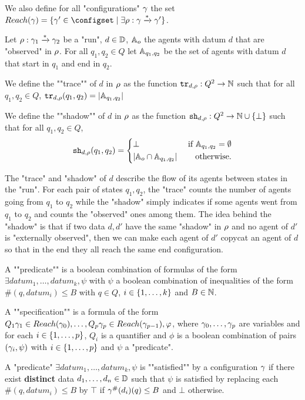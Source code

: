 We also define for all "configurations" $\gamma$ the set $\Reach(\config) = \set{\config' \in \configset \mid \exists \run : \config \xrightarrow{*} \config'}$.


\begin{definition}
	Let $\rho : \gamma_1 \xrightarrow{*} \gamma_2$ be a "run", $d\in \mathbb{D}$, $\mathbb{A}_o$ the agents with datum $d$ that are "observed" in $\rho$. For all $q_1, q_2 \in Q$ let $\mathbb{A}_{q_1, q_2}$ be the set of agents with datum $d$ that start in $q_1$ and end in $q_2$.
	
	We define the ""trace"" of $d$ in $\rho$ as the function $\mathtt{tr}_{d,\rho} : Q^2 \to \mathbb{N}$ such that for all $q_1, q_2 \in Q$,	$\mathtt{tr}_{d,\rho}(q_1, q_2) = |\mathbb{A}_{q_1, q_2}|$
		
	
	\AP We define the ""shadow"" of $d$ in $\rho$ as the function $\mathtt{sh}_{d,\rho} : Q^2 \to \mathbb{N} \cup \{\bot\}$ such that for all $q_1, q_2 \in Q$, 
	\begin{equation}
		\mathtt{sh}_{d,\rho}(q_1, q_2) = 
		\left\{
		\begin{aligned}
			&\bot &\text{ if } \mathbb{A}_{q_1,q_2} =\emptyset\\
			&|\mathbb{A}_o \cap \mathbb{A}_{q_1, q_2}| &\text{ otherwise.}
		\end{aligned}
		\right.
	\end{equation}
\end{definition}
%	
The "trace" and "shadow" of $d$ describe the flow of its agents between states in the "run". For each pair of states $q_1, q_2$, the "trace" counts the number of agents going from $q_1$ to $q_2$ while
the "shadow" simply indicates if some agents went from $q_1$ to $q_2$ and counts the "observed" ones among them. The idea behind the "shadow" is that if two data $d, d'$ have the same "shadow" in $\rho$ and no agent of $d'$ is "externally observed", then we can make each agent of $d'$ copycat an agent of $d$ so that in the end they all reach the same end configuration.


\begin{definition}
	A ""predicate"" is a boolean combination of formulas of the form $\exists datum_1, \ldots, datum_k, \psi$ with $\psi$ a boolean combination of inequalities of the form $\#(q,datum_i) \leq B$ with $q\in Q$, $i \in \{1,\dots,k\}$ and $B \in \mathbb{N}$.
	
	A ""specification"" is a formula of the form $Q_1 \gamma_1  \in Reach(\gamma_0), \ldots, Q_p \gamma_p \in Reach(\gamma_{p-1}), \varphi$, where $\gamma_0, \ldots, \gamma_{p}$ are variables and for each $i \in \{1,\dots,p\}$, $Q_i$ is a quantifier and $\phi$ is a boolean combination of pairs $(\gamma_i, \psi)$ with $i \in \{1,\dots,p\}$ and $\psi$ a "predicate".
	
\end{definition}

A "predicate" $\exists datum_1, \ldots, datum_k, \psi$ is ""satisfied"" by a configuration $\gamma$ if there exist \textbf{distinct} data $d_1, \ldots, d_n \in \mathbb{D}$ such that $\psi$ is satisfied by replacing each $\#(q,datum_i) \leq B$ by $\top$ if $\gamma^{\#}(d_i)(q) \leq B$ and $\bot$ otherwise.
